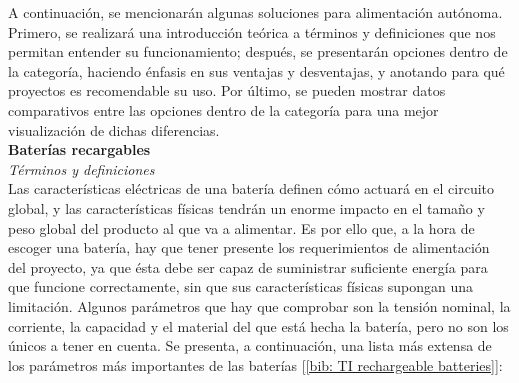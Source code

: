 \documentclass[12pt]{article}
\begin{document}
	\noindent A continuación, se mencionarán algunas soluciones para alimentación autónoma. Primero, se realizará una introducción teórica a términos y definiciones que nos permitan entender su funcionamiento; después, se presentarán opciones dentro de la categoría, haciendo énfasis en sus ventajas y desventajas, y anotando para qué proyectos es recomendable su uso. Por último, se pueden mostrar datos comparativos entre las opciones dentro de la categoría para una mejor visualización de dichas diferencias.\\ 
	
	\noindent \textbf{Baterías recargables} \\
	
	\noindent \textit{Términos y definiciones} \\
	
	\noindent Las características eléctricas de una batería definen cómo actuará en el circuito global, y las características físicas tendrán un enorme impacto en el tamaño y peso global del producto al que va a alimentar. Es por ello que, a la hora de escoger una batería, hay que tener presente los requerimientos de alimentación del proyecto, ya que ésta debe ser capaz de suministrar suficiente energía para que funcione correctamente, sin que sus características físicas supongan una limitación. Algunos parámetros que hay que comprobar son la tensión nominal, la corriente, la capacidad y el material del que está hecha la batería, pero no son los únicos a tener en cuenta. Se presenta, a continuación, una lista más extensa de los parámetros más importantes de las baterías [\ref{bib: TI rechargeable batteries}]: 
	
\end{document}
